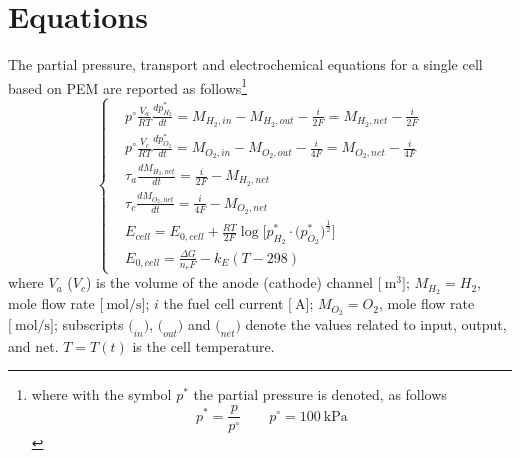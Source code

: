 \documentclass[11pt,a4paper]{article}
\numberwithin{equation}{section}
\theoremstyle{it}
\theoremstyle{definition}
\begin{document}
\section{Equations}
The partial pressure, transport and electrochemical equations for a single cell based on PEM are reported as follows\footnote{where with the symbol $p^*$ the partial pressure is denoted, as follows \begin{equation}\label{ele_chem_28}
		p^*=\frac{p}{p^\circ}\qquad p^\circ=\SI{100}{\kilo\pascal}
\end{equation}}
\begin{equation}\label{cell_eq}
	\left\lbrace \begin{aligned}
		&	p^\circ\frac{V_a}{RT}\frac{dp_{H_2}^*}{dt} = M_{H_2,in} - M_{H_2,out} - \frac{i}{2F} = M_{H_2,net} - \frac{i}{2F} \\[8pt]
		&	p^\circ\frac{V_c}{RT}\frac{dp_{O_2}^*}{dt} = M_{O_2,in} - M_{O_2,out} - \frac{i}{4F} = M_{O_2,net} - \frac{i}{4F} \\[8pt]
		&	\tau_{a}\frac{dM_{H_2,net}}{dt} = \frac{i}{2F} - M_{H_2,net} \\[8pt]
		&	\tau_{c}\frac{dM_{O_2,net}}{dt} = \frac{i}{4F} - M_{O_2,net} \\[8pt]
		&	E_{cell} = E_{0,cell} + \frac{RT}{2F}\log\Bigg[{p_{H_2}^*\cdot\Big(p_{O_2}^*\Big)^{\frac{1}{2}}}\Bigg] \\[8pt]
		&	E_{0,cell} = \frac{\Delta G}{n_eF} - k_E(T-298)
	\end{aligned}\right. 
\end{equation}
where $V_a$ ($V_c$) is the volume of the anode (cathode) channel $\Big[\SI{}{\cubic\meter}\Big]$; $M_{H_2}=H_2$, mole flow rate $\Big[\SI{}{\mole\per\second}\Big]$; $i$ the fuel cell current $\Big[\SI{}{\ampere}\Big]$; $M_{O_2}=O_2$, mole flow rate $\Big[\SI{}{\mole\per\second}\Big]$; subscripts $\Big(_{in}\Big)$, $\Big(_{out}\Big)$ and $\Big(_{net}\Big)$ denote the values related to input, output, and net. $T=T(t)$ is the cell temperature. 
\end{document}
